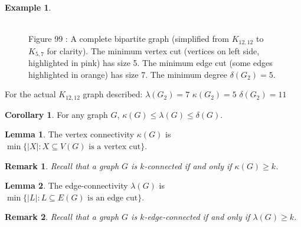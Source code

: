 \documentclass{article}
\newtheorem{remark}{Remark}
\theoremstyle{definition}
\newtheorem{example}{Example}
\newtheorem{lemma}{Lemma}
\newtheorem{corollary}{Corollary}
\begin{document}
\begin{example}
\begin{figure}[h]
\\
\small Figure 99 : {A complete bipartite graph (simplified from $K_{12,12}$ to $K_{5,7}$ for clarity). The minimum vertex cut (vertices on left side, highlighted in pink) has size 5. The minimum edge cut (some edges highlighted in orange) has size 7. The minimum degree $\delta(G_2) = 5$.}
\end{figure}

For the actual $K_{12,12}$ graph described:
$\lambda(G_2) = 7$
$\kappa(G_2) = 5$
$\delta(G_2) = 11$
\end{example}

\begin{corollary}
For any graph $G$,
$\kappa(G) \leq \lambda(G) \leq \delta(G)$.
\end{corollary}

\begin{lemma}
The vertex connectivity $\kappa(G)$ is
$\min\{|X| : X \subseteq V(G) \text{ is a vertex cut}\}$.
\end{lemma}

\begin{remark}
Recall that a graph $G$ is $k$-connected if and only if
$\kappa(G) \geq k$.
\end{remark}

\begin{lemma}
The edge-connectivity $\lambda(G)$ is
$\min\{|L| : L \subseteq E(G) \text{ is an edge cut}\}$.
\end{lemma}

\begin{remark}
Recall that a graph $G$ is $k$-edge-connected if and only if
$\lambda(G) \geq k$.
\end{remark}
\end{document}
